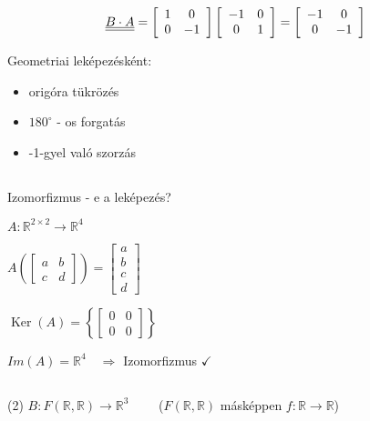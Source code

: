 $$
\underline{\underline{B \cdot A}}=\left[\begin{array}{cc}
1 & 0 \\
0 & -1
\end{array}\right]
\left[\begin{array}{cc}
-1 & 0 \\
0 & 1
\end{array}\right]=\left[\begin{array}{cc}
-1 & 0 \\
0 & -1
\end{array}\right] \\
$$

Geometriai leképezésként:
\begin{itemize}
    \item origóra tükrözés
    \item $180^{\circ}$ - os forgatás
    \item -1-gyel való szorzás
\end{itemize}

\subsection{}
Izomorfizmus - e a leképezés?

\vspace{2mm}
$A: \mathbb{R}^{2 \times 2} \rightarrow \mathbb{R}^{4}$


$A\left(\left[\begin{array}{ll}a & b \\ c & d\end{array}\right]\right)=\left[\begin{array}{l}a \\ b \\ c \\ d\end{array}\right]$

\vspace{2mm}
$\operatorname{Ker}(A)=\left\{\left[\begin{array}{ll}0 & 0 \\ 0 & 0\end{array}\right]\right\}$

\vspace{2mm}
$Im(A)=\mathbb{R}^{4} \quad \Rightarrow$ Izomorfizmus $\checkmark$

\subsection{}
(2) $B: F(\mathbb{R}, \mathbb{R}) \rightarrow \mathbb{R}^{3} \qquad$ ($F(\mathbb{R}, \mathbb{R})$ másképpen $f: \mathbb{R} \longrightarrow \mathbb{R}$)

